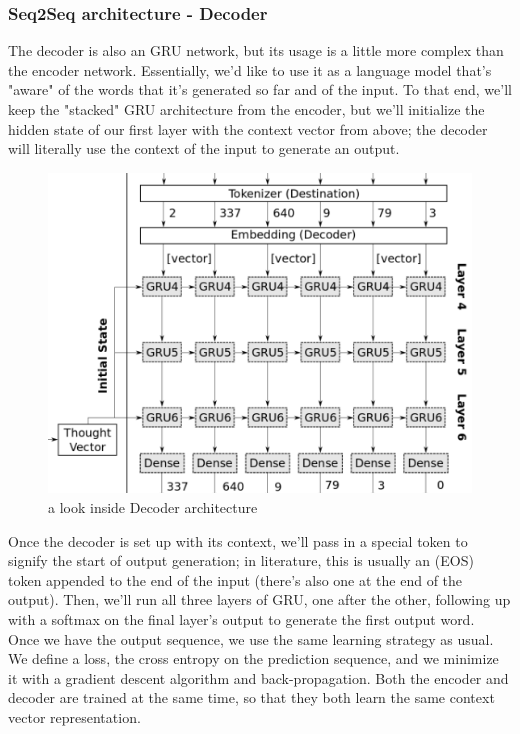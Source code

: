 \subsubsection{Seq2Seq architecture - Decoder}
The decoder is also an GRU network, but its usage is a little more complex than the encoder network. Essentially, we’d like to use it as a language model that’s "aware" of the words that it’s generated
so far and of the input. To that end, we’ll keep the "stacked" GRU
architecture from the encoder, but we’ll initialize the hidden state of
our first layer with the context vector from above; the decoder will
literally use the context of the input to generate an output.
\begin{figure}[H]%
    \center%
    \includegraphics[width=.6\textwidth]{images/amir/dec.png}%
    \caption[Decoder Details]{ a look inside Decoder architecture \cite{web018}
    }\label{fig:decoder}%
  \end{figure}
Once the decoder is set up with its context, we’ll pass in a special
token to signify the start of output generation; in literature, this is
usually an (EOS) token appended to the end of the input (there’s
also one at the end of the output).
Then, we’ll run all three layers of
GRU, one after the other, following up with a softmax on the final
layer’s output to generate the first output word.\\
Once we have the output sequence, we use the same learning strategy
as usual. We define a loss, the cross entropy on the prediction
sequence, and we minimize it with a gradient descent algorithm and
back-propagation. Both the encoder and decoder are trained at the
same time, so that they both learn the same context vector representation.

